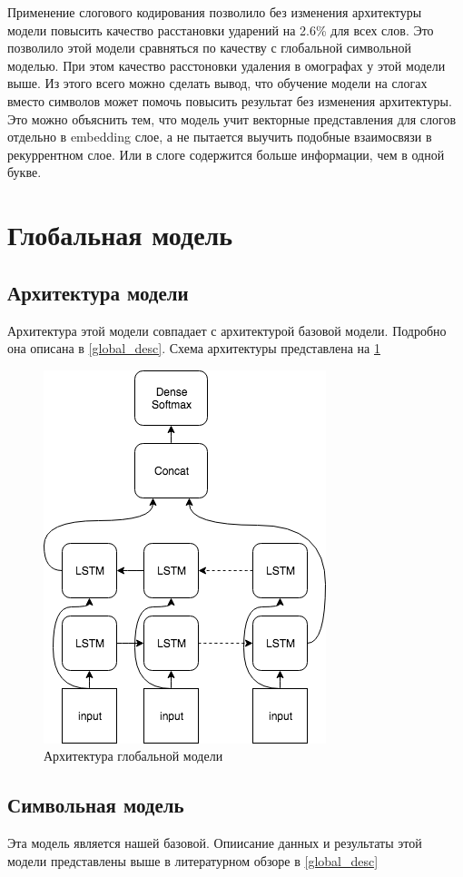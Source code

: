 \documentclass[14pt, a4paper, russian]{extreport}
\begin{document}
Применение слогового кодирования позволило без изменения архитектуры модели повысить качество расстановки ударений на 2.6\% для всех слов. Это позволило этой модели сравняться по качеству с глобальной символьной моделью. При этом качество расстоновки удаления в омографах у этой модели выше. Из этого всего можно сделать вывод, что обучение модели на слогах вместо символов может помочь повысить результат  без изменения архитектуры. Это можно объяснить тем, что модель учит векторные представления для слогов отдельно в embedding слое, а не пытается выучить подобные взаимосвязи в рекуррентном слое. Или  в слоге содержится больше информации, чем в одной букве.

\section{Глобальная модель}
\subsection{Архитектура модели}
Архитектура этой модели совпадает с архитектурой базовой модели. Подробно она описана в \cref{global_desc}. 
Схема архитектуры представлена на \cref{fig:base_global2}

\begin{figure}[H]
	\begin{center}
		\includegraphics[width=0.5\linewidth]{Baseline}
	\end{center}
	\caption{\small{Архитектура глобальной модели}}
	\label{fig:base_global2}
\end{figure}

\subsection{Символьная модель}
Эта модель является нашей базовой. Опиисание данных и результаты этой модели представлены выше в литературном обзоре в \cref{global_desc}
\end{document}
